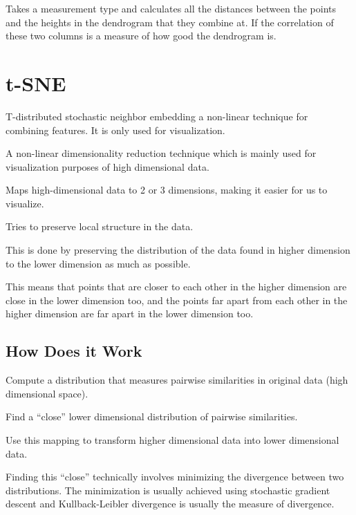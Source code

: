 Takes a measurement type and calculates all the distances between the points and the heights in the dendrogram that they combine at.  If the correlation of these two columns is a measure of how good the dendrogram is.

	\section{t-SNE}
T-distributed stochastic neighbor embedding a non-linear technique for combining features.  It is only used for visualization.
	\begin{bulletedlist}
		\item A non-linear dimensionality reduction technique which is mainly used for visualization purposes of high dimensional data.
		\item Maps high-dimensional data to 2 or 3 dimensions, making it easier for us to visualize.
		\item Tries to preserve local structure in the data.
		\begin{bulletedlist}
			\item This is done by preserving the distribution of the data found in higher dimension to the lower dimension as much as possible.
			\item This means that points that are closer to each other in the higher dimension are close in the lower dimension too, and the points far apart from each other in the higher dimension are far apart in the lower dimension too.
		\end{bulletedlist}
	\end{bulletedlist}

	\subsection{How Does it Work}
	\begin{bulletedlist}
		\item Compute a distribution that measures pairwise similarities in original data (high dimensional space).
		\item Find a ``close'' lower dimensional distribution of pairwise similarities.
		\item Use this mapping to transform higher dimensional data into lower dimensional data.
		\item Finding this ``close''  technically involves minimizing the divergence between two distributions.  The minimization is usually achieved using stochastic gradient descent and Kullback-Leibler divergence is usually the measure of divergence.
	\end{bulletedlist}

